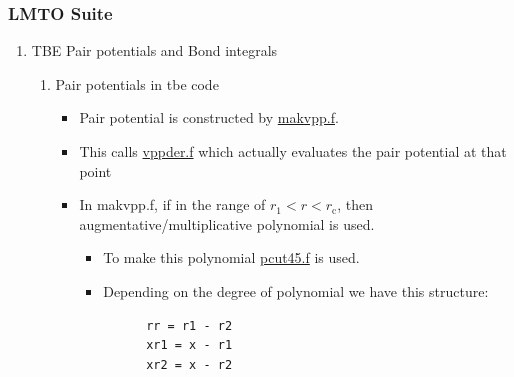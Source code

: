\documentclass[11pt]{article}
\begin{document}
\subsubsection{LMTO Suite}
\label{sec:orga94507f}
\begin{enumerate}
\item TBE Pair potentials and Bond integrals
\label{sec:org51329e5}
\begin{enumerate}
\item Pair potentials in tbe code
\label{sec:orgc0d8c79}
\begin{itemize}
\item Pair potential is constructed by \href{file:///home/tigany/lm/tb/makvpp.f}{makvpp.f}.
\item This calls \href{file:///home/tigany/lm/tb/vppder.f}{vppder.f} which actually evaluates the pair potential at that
point
\item In makvpp.f, if in the range of \(r_1 < r < r_{\text{c}}\), then
augmentative/multiplicative polynomial is used.
\begin{itemize}
\item To make this polynomial \href{file:///home/tigany/lm/tb/pcut45.f}{pcut45.f} is used.
\item Depending on the degree of polynomial we have this structure:
\begin{verbatim}
      rr = r1 - r2
      xr1 = x - r1
      xr2 = x - r2


\end{verbatim}
\end{itemize}
\end{itemize}
\end{enumerate}
\end{enumerate}
\end{document}
